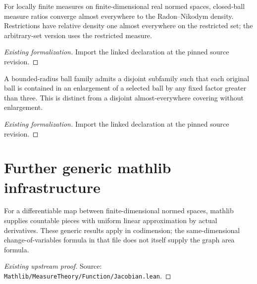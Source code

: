 \begin{lemma}
\label{mathlib:besicovitch-differentiation}
\leanok
For locally finite measures on finite-dimensional real normed spaces, closed-ball measure ratios converge almost everywhere to the Radon--Nikodym density. Restrictions have relative density one almost everywhere on the restricted set; the arbitrary-set version uses the restricted measure.
\end{lemma}
\begin{proof}[Existing formalization]
\leanok
Import the linked declaration at the pinned source revision.
\end{proof}

\begin{lemma}
\label{mathlib:vitali-enlargement}
\leanok
A bounded-radius ball family admits a disjoint subfamily such that each original ball is contained in an enlargement of a selected ball by any fixed factor greater than three. This is distinct from a disjoint almost-everywhere covering without enlargement.
\end{lemma}
\begin{proof}[Existing formalization]
\leanok
Import the linked declaration at the pinned source revision.
\end{proof}



\section{Further generic mathlib infrastructure}
\begin{lemma}
\label{mathlib:derivative-partitions}
\leanok
For a differentiable map between finite-dimensional normed spaces, mathlib supplies
countable pieces with uniform linear approximation by actual derivatives.
These generic results apply in codimension; the same-dimensional change-of-variables
formula in that file does not itself supply the graph area formula.
\end{lemma}
\begin{proof}[Existing upstream proof]
\leanok
Source: \texttt{Mathlib/MeasureTheory/Function/Jacobian.lean}.
\end{proof}

